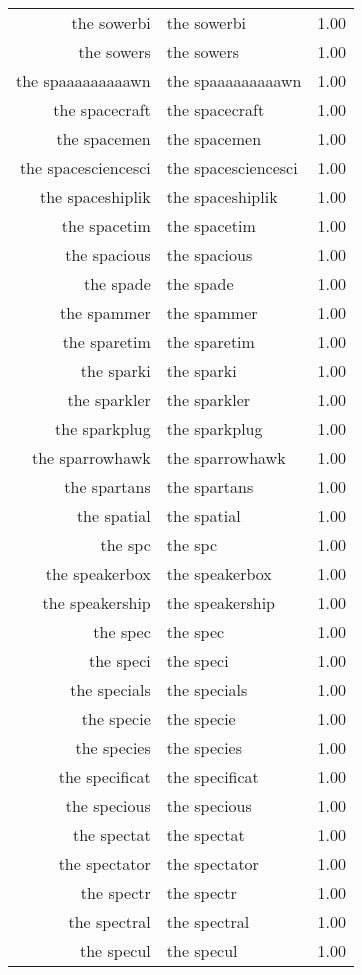 \begin{table}[ht]
\begin{tabular}{rlr}
  the sowerbi & the sowerbi & 1.00 \\ 
  the sowers & the sowers & 1.00 \\ 
  the spaaaaaaaaawn & the spaaaaaaaaawn & 1.00 \\ 
  the spacecraft & the spacecraft & 1.00 \\ 
  the spacemen & the spacemen & 1.00 \\ 
  the spacesciencesci & the spacesciencesci & 1.00 \\ 
  the spaceshiplik & the spaceshiplik & 1.00 \\ 
  the spacetim & the spacetim & 1.00 \\ 
  the spacious & the spacious & 1.00 \\ 
  the spade & the spade & 1.00 \\ 
  the spammer & the spammer & 1.00 \\ 
  the sparetim & the sparetim & 1.00 \\ 
  the sparki & the sparki & 1.00 \\ 
  the sparkler & the sparkler & 1.00 \\ 
  the sparkplug & the sparkplug & 1.00 \\ 
  the sparrowhawk & the sparrowhawk & 1.00 \\ 
  the spartans & the spartans & 1.00 \\ 
  the spatial & the spatial & 1.00 \\ 
  the spc & the spc & 1.00 \\ 
  the speakerbox & the speakerbox & 1.00 \\ 
  the speakership & the speakership & 1.00 \\ 
  the spec & the spec & 1.00 \\ 
  the speci & the speci & 1.00 \\ 
  the specials & the specials & 1.00 \\ 
  the specie & the specie & 1.00 \\ 
  the species & the species & 1.00 \\ 
  the specificat & the specificat & 1.00 \\ 
  the specious & the specious & 1.00 \\ 
  the spectat & the spectat & 1.00 \\ 
  the spectator & the spectator & 1.00 \\ 
  the spectr & the spectr & 1.00 \\ 
  the spectral & the spectral & 1.00 \\ 
  the specul & the specul & 1.00 \\ 

\end{tabular}
\end{table}
